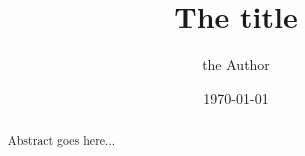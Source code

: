 \documentclass[]{article}
\title{The title}
\author{the Author}
\date{\today}
\begin{document}
\maketitle

\begin{abstract}
    Abstract goes here...
\end{abstract}
\end{document}
